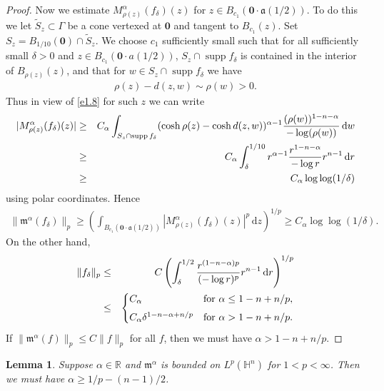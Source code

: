 \documentclass[11pt]{amsproc}
\newcommand{\R}{\mathbb{R}}
\newcommand{\supp}{\mathop{\mathrm{supp}}}
\newcommand{\fm}{\mathfrak{m}}
\newcommand{\0}{\mathbf{0}}
\newcommand{\fa}{\mathfrak{a}}
\renewcommand{\H}{\mathbb{H}}
\renewcommand{\d}{\mathrm{d}}
\numberwithin{equation}{section}
\numberwithin{figure}{section}
\newtheorem{lem}[thm]{Lemma}
\theoremstyle{definition}
\theoremstyle{remark}
\numberwithin{thm}{section}
\begin{document}
\begin{proof}
Now we estimate $M^\alpha_{\rho(z)}(f_\delta)(z)$ for $z\in B_{c_1}(\0\cdot \fa(1/2))$. To do this we let $\widetilde{S}_z\subset\Gamma$ be a cone vertexed at $\0$ and tangent to $B_{c_1}(z)$. Set $S_z=B_{1/10}(\0)\cap \widetilde{S}_z$. We choose $c_1$ sufficiently small such that for all sufficiently small $\delta>0$ and $z\in B_{c_1}(\0\cdot a(1/2))$, $S_z\cap \supp f_\delta$ is contained in the interior of $B_{\rho(z)}(z)$, and that for $w\in S_z\cap \supp f_\delta$ we have
\begin{eqnarray*}
\rho(z)-d(z,w)\sim \rho(w)>0.
\end{eqnarray*}
Thus in view of \eqref{e1.8} for such $z$ we can write
\begin{eqnarray*}
|M^\alpha_{\rho(z)}(f_\delta)(z)|
&\geq &C_\alpha\int_{S_z\cap \supp f_\delta} (\cosh\rho(z)-\cosh d(z,w))^{\alpha-1}{(\rho(w))^{1-n-\alpha}\over -\log(\rho(w))}\,\d w\\
&\geq &C_\alpha\int_\delta^{1/10} r^{\alpha-1}{r^{1-n-\alpha}\over -\log r}r^{n-1}\,\d r\\
&\geq &C_\alpha\log\log(1/\delta)
\end{eqnarray*}
using polar coordinates. Hence
\begin{eqnarray*}
\|\fm^\alpha(f_\delta)\|_p\geq \left(\int_{B_{c_1}(\0\cdot \fa(1/2))}|M^\alpha_{\rho(z)}(f_\delta)(z)|^p\,\d z\right)^{1/p}\geq C_\alpha\log\log(1/\delta).
\end{eqnarray*}
On the other hand,
\begin{eqnarray*}
\|f_\delta\|_p&\leq &C\left(\int_\delta^{1/2}{r^{(1-n-\alpha)p}\over (-\log r)^p}r^{n-1}\,\d r\right)^{1/p}\\
&\leq & \begin{cases}
C_\alpha& \mbox{for }\alpha\leq 1-n+n/p,\\[4pt]
C_\alpha\delta^{1-n-\alpha+n/p}& \mbox{for }\alpha>1-n+n/p.
\end{cases}
\end{eqnarray*}
If $\|\fm^\alpha(f)\|_p\leq C\|f\|_p$ for all $f$, then we must have $\alpha>1-n+n/p$.
\end{proof}

\begin{lem}\label{le4.2} 	Suppose $\alpha\in\R$ and $\fm^\alpha$ is bounded on $L^p(\H^n)$ for $1<p<\infty$.
Then   we must have $\alpha\geq1/p-(n-1)/2$.
\end{lem}
\end{document}
